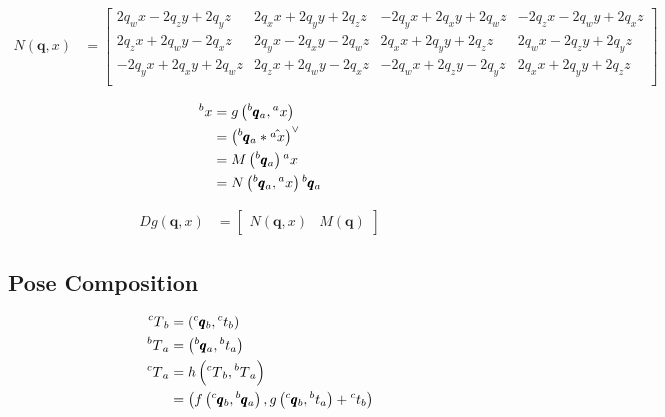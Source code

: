 \documentclass{article}
\begin{document}
\begin{align*}
    N(\pmb{q}, x) &= \begin{bmatrix}
        2 q_w x - 2 q_z y + 2 q_y z & 2 q_x x + 2 q_y y + 2 q_z z & -2 q_y x + 2 q_x y + 2 q_w z & -2 q_z x - 2 q_w y + 2 q_x z \\
        2 q_z x + 2 q_w y - 2 q_x z & 2 q_y x - 2 q_x y - 2 q_w z & 2 q_x x + 2 q_y y + 2 q_z z & 2 q_w x - 2 q_z y + 2 q_y z \\
        -2 q_y x + 2 q_x y + 2 q_w z & 2 q_z x + 2 q_w y - 2 q_x z & - 2 q_w x + 2 q_z y - 2 q_y z & 2 q_x x + 2 q_y y + 2 q_z z \\
    \end{bmatrix}
\end{align*}

\begin{align*}
    \prescript{b}{}{x} &= g\left(\prescript{b}{}{\pmb{q}}_a, \prescript{a}{}{x}\right) \\
    &= \left(\prescript{b}{}{\pmb{q}}_a * \hat{\prescript{a}{}{x}}\right)^\vee \\
    &= M\left( \prescript{b}{}{\pmb{q}}_a \right) \prescript{a}{}{x} \\
    &= N\left( \prescript{b}{}{\pmb{q}}_a, \prescript{a}{}{x} \right) \prescript{b}{}{\pmb{q}}_a
\end{align*}

\begin{align*}
    Dg(\pmb{q}, x) &= \begin{bmatrix}
        N(\pmb{q}, x) & M(\pmb{q})
    \end{bmatrix}
\end{align*}

\subsection{Pose Composition}

\begin{align*}
    \prescript{c}{}{T}_b &= \left( \prescript{c}{}{\pmb{q}}_b, \prescript{c}{}{t}_b \right) \\
    \prescript{b}{}{T}_a &= \left( \prescript{b}{}{\pmb{q}}_a, \prescript{b}{}{t}_a \right) \\
    \prescript{c}{}{T}_a &= h\left( \prescript{c}{}{T}_b, \prescript{b}{}{T}_a \right) \\
    &= \left( f\left(\prescript{c}{}{\pmb{q}}_b, \prescript{b}{}{\pmb{q}}_a \right), g \left( \prescript{c}{}{\pmb{q}}_b, \prescript{b}{}{t}_a \right) + \prescript{c}{}{t}_b \right) \\
\end{align*}
\end{document}
